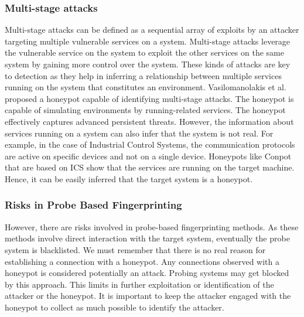 \subsubsection{Multi-stage attacks}
Multi-stage attacks can be defined as a sequential array of exploits by an attacker targeting multiple vulnerable services on a system. Multi-stage attacks leverage the vulnerable service on the system to exploit the other services on the same system by gaining more control over the system. These kinds of attacks are key to detection as they help in inferring a relationship between multiple services running on the system that constitutes an environment. Vasilomanolakis et al. \cite{vasilomanolakis} proposed a honeypot capable of identifying multi-stage attacks. The honeypot is capable of simulating environments by running-related services. The honeypot effectively captures advanced persistent threats. However, the information about services running on a system can also infer that the system is not real. For example, in the case of Industrial Control Systems, the communication protocols are active on specific devices and not on a single device. Honeypots like Conpot that are based on ICS show that the services are running on the target machine. Hence, it can be easily inferred that the target system is a honeypot. 
\newline

\subsubsection{Risks in Probe Based Fingerprinting}
However, there are risks involved in probe-based fingerprinting methods. As these methods involve direct interaction with the target system, eventually the probe system is blacklisted. We must remember that there is no real reason for establishing a connection with a honeypot. Any connections observed with a honeypot is considered potentially an attack. Probing systems may get blocked by this approach. This limits in further exploitation or identification of the attacker or the honeypot. It is important to keep the attacker engaged with the honeypot to collect as much possible to identify the attacker. 

